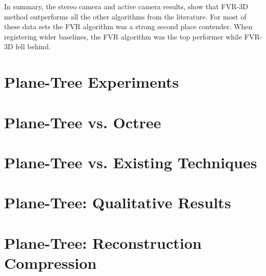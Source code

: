 In summary, the stereo camera and active camera results, show that FVR-3D method outperforms all the other algorithms from the literature. For most of these data sets the FVR algorithm was a strong second place contender. When registering wider baselines, the FVR algorithm was the top performer while FVR-3D fell behind.

\section{Plane-Tree Experiments}

\section{Plane-Tree vs. Octree}
\label{SEC:PTVSOT}

\section{Plane-Tree vs. Existing Techniques}
\label{SEC:PTVSSOTA}

\section{Plane-Tree: Qualitative Results}
\label{SEC:PTQUALEVAL}

\section{Plane-Tree: Reconstruction Compression}
\label{SEC:PTONRECON}




